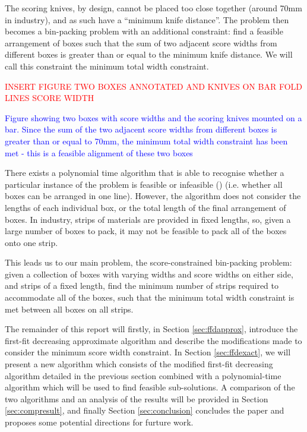 \documentclass[oribibl]{llncs}
\begin{document}
The scoring knives, by design, cannot be placed too close together (around 70mm in industry), and as such have a ``minimum knife distance''. The problem then becomes a bin-packing problem with an additional constraint: find a feasible arrangement of boxes such that the sum of two adjacent score widths from different boxes is greater than or equal to the minimum knife distance. We will call this constraint the minimum total width constraint.

\textcolor{red}{INSERT FIGURE TWO BOXES ANNOTATED AND KNIVES ON BAR FOLD LINES SCORE WIDTH}

\textcolor{blue}{Figure showing two boxes with score widths and the scoring knives mounted on a bar. Since the sum of the two adjacent score widths from different boxes is greater than or equal to 70mm, the minimum total width constraint has been met - this is a feasible alignment of these two boxes}

There exists a polynomial time algorithm that is able to recognise whether a particular instance of the problem is feasible or infeasible (\citealp{becker2010}) (i.e. whether all boxes can be arranged in one line). However, the algorithm does not consider the lengths of each individual box, or the total length of the final arrangement of boxes. In industry, strips of materials are provided in fixed lengths, so, given a large number of boxes to pack, it may not be feasible to pack all of the boxes onto one strip. 

This leads us to our main problem, the score-constrained bin-packing problem: given a collection of boxes with varying widths and score widths on either side, and strips of a fixed length, find the minimum number of strips required to accommodate all of the boxes, such that the minimum total width constraint is met between all boxes on all strips. 

The remainder of this report will firstly, in Section \ref{sec:ffdapprox}, introduce the first-fit decreasing approximate algorithm and describe the modifications made to consider the minimum score width constraint. In Section \ref{sec:ffdexact}, we will present a new algorithm which consists of the modified first-fit decreasing algorithm detailed in the previous section combined with a polynomial-time algorithm which will be used to find feasible sub-solutions. A comparison of the two algorithms and an analysis of the results will be provided in Section \ref{sec:compresult}, and finally Section \ref{sec:conclusion} concludes the paper and proposes some potential directions for furture work.
\end{document}
